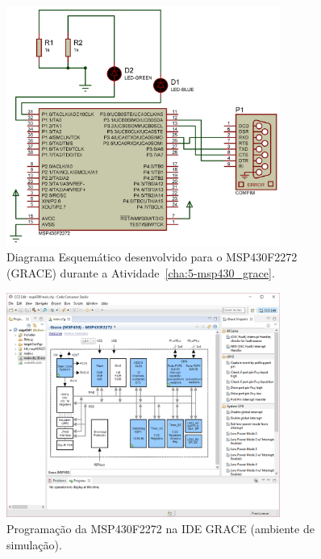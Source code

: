 \documentclass[
	12pt,				%
	openright,			%
  oneside,     %
	a4paper,			%
	english,			%
	french,				%
	spanish,			%
	brazil				%
	]{abntex2}
\begin{document}
\begin{figure}[ht]
  \centering
  \caption{\label{fig:Atividade-05-05-Schematic-01}Diagrama Esquemático desenvolvido para o MSP430F2272 (GRACE) durante a Atividade~\ref{cha:5-msp430_grace}.}
  \includegraphics[width=0.8\textwidth]{images/Atividade05/Atividade-05-05-Schematic-01-recortado.png}
\end{figure}

\begin{figure}[ht]
  \centering
  \caption{\label{fig:APP-GRACE00}Programação da MSP430F2272 na IDE GRACE (ambiente de simulação).}
  \includegraphics[width=0.8\textwidth]{images/Atividade05/APP-GRACE00.png}
\end{figure}
\end{document}
